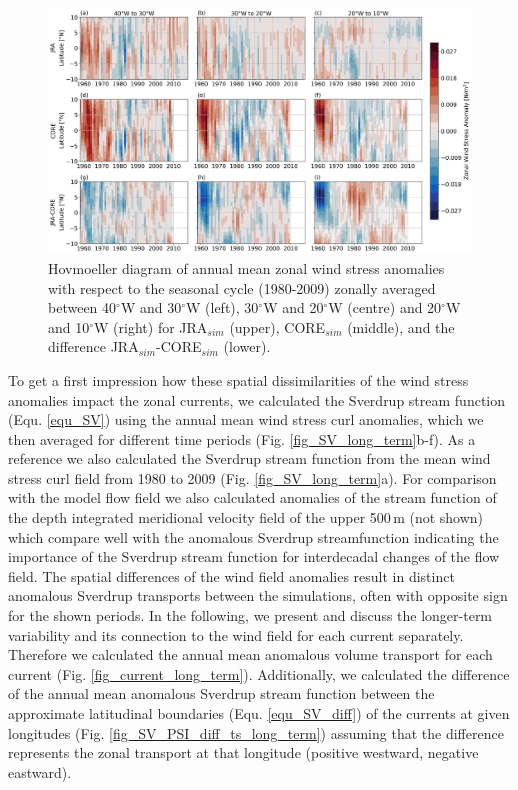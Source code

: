 \documentclass[os, manuscript]{copernicus}
\begin{document}
\begin{figure}[t]
	\includegraphics[width=12cm]{../../figures/paper/f08_INALT_JRA_CORE_taux_anomaly_hovm_merid_all_lon.png}
	\caption{Hovmoeller diagram of annual mean zonal wind stress anomalies with respect to the seasonal cycle (1980-2009) zonally averaged between 40$^{\circ}$W and 30$^{\circ}$W (left), 30$^{\circ}$W and 20$^{\circ}$W (centre) and 20$^{\circ}$W and 10$^{\circ}$W (right) for JRA$_{sim}$ (upper), CORE$_{sim}$ (middle), and the difference JRA$_{sim}$-CORE$_{sim}$ (lower).
	}
	\label{fig_taux_long_term}
\end{figure}

To get a first impression how these spatial dissimilarities of the wind stress anomalies impact the zonal currents, we calculated the Sverdrup stream function (Equ. \ref{equ_SV}) using the annual mean wind stress curl anomalies, which we then averaged for different time periods (Fig. \ref{fig_SV_long_term}b-f). As a reference we also calculated the Sverdrup stream function from the mean wind stress curl field from 1980 to 2009 (Fig. \ref{fig_SV_long_term}a). For comparison with the model flow field we also calculated anomalies of the stream function of the depth integrated meridional velocity field of the upper 500$\,$m (not shown) which compare well with the anomalous Sverdrup streamfunction indicating the importance of the Sverdrup stream function for interdecadal changes of the flow field. The spatial differences of the wind field anomalies result in distinct anomalous Sverdrup transports between the simulations, often with opposite sign for the shown periods. In the following, we present and discuss the longer-term variability and its connection to the wind field for each current separately. Therefore we calculated the annual mean anomalous volume transport for each current (Fig. \ref{fig_current_long_term}). Additionally, we calculated the difference of the annual mean anomalous Sverdrup stream function between the approximate latitudinal boundaries (Equ. \ref{equ_SV_diff}) of the currents at given longitudes (Fig. \ref{fig_SV_PSI_diff_ts_long_term}) assuming that the difference represents the zonal transport at that longitude (positive westward, negative eastward).
\end{document}

